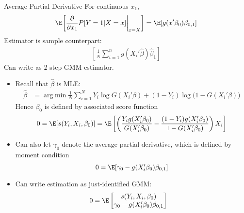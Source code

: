 \documentclass[handout]{beamer}
\DeclareMathOperator*{\argmin}{arg\;min}
\newcommand{\sumin}{\sum^n_{i=1}}
\newcommand{\sumiN}{\sum^N_{i=1}}
\begin{document}
\begin{frame}[shrink]{Average Partial Derivative}
For continuous $x_1$,
\begin{align*}
  \E\bigg[
  \frac{\partial }{\partial x_1}
  P[Y=1|X=x]
  \bigg|_{x=X}
  \bigg]
  =
  \E[g(x'\beta_0)\beta_{0,1}]
\end{align*}
Estimator is sample counterpart:
\begin{align*}
  \left[
    \frac{1}{N}
    \sumin
    g(X_i'\hat{\beta})\hat{\beta}_1
  \right]
\end{align*}
Can write as 2-step GMM estimator.
\begin{itemize}
  \item Recall that $\hat{\beta}$ is MLE:
    \begin{align*}
      \hat{\beta}
      &=
      \argmin
      \frac{1}{N}
      \sumiN
      Y_i\log G(X_i'\beta)
      +
      (1-Y_i)\log\big(1-G(X_i'\beta)\big)
    \end{align*}
    Hence $\beta_0$ is defined by associated score function
    \begin{align*}
      0 = \E[s(Y_i,X_i,\beta_0)]
      =
      \E\left[
        \left(
        \frac{Y_ig(X_i'\beta_0)}{G(X_i'\beta_0)}
        -
        \frac{(1-Y_i)g(X_i'\beta_0)}{1-G(X_i'\beta_0)}
        \right)
        X_i
      \right]
    \end{align*}

  \item
    Can also let $\gamma_0$ denote the average partial derivative, which
    is defined by moment condition
    \begin{align*}
      0 = \E[\gamma_0-g(X_i'\beta_0)\beta_{0,1}]
    \end{align*}

  \item
    Can write estimation as just-identified GMM:
    \begin{align*}
      0
      &=
      \E
        \begin{bmatrix}
          s(Y_i,X_i,\beta_0)
          \\
          \gamma_0-g(X_i'\beta_0)\beta_{0,1}
        \end{bmatrix}
    \end{align*}
\end{itemize}
\end{frame}
\end{document}
